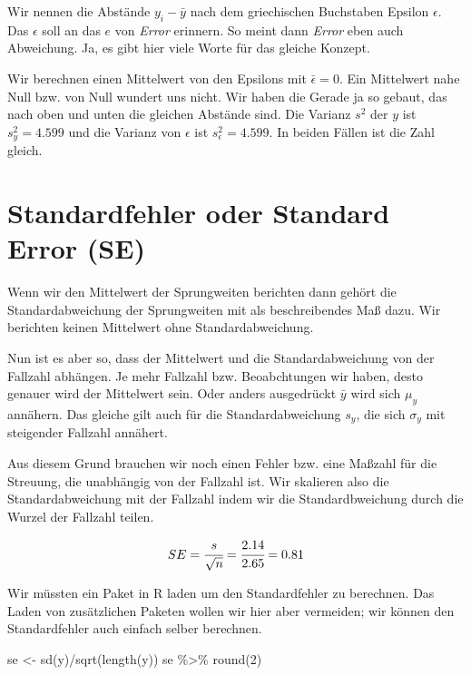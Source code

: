 \documentclass[
  letterpaper,
]{scrbook}
\newenvironment{Shaded}{\begin{snugshade}}{\end{snugshade}}
\newcommand{\DecValTok}[1]{\textcolor[rgb]{0.68,0.00,0.00}{#1}}
\newcommand{\FunctionTok}[1]{\textcolor[rgb]{0.28,0.35,0.67}{#1}}
\newcommand{\NormalTok}[1]{\textcolor[rgb]{0.00,0.23,0.31}{#1}}
\newcommand{\OtherTok}[1]{\textcolor[rgb]{0.00,0.23,0.31}{#1}}
\newcommand{\SpecialCharTok}[1]{\textcolor[rgb]{0.37,0.37,0.37}{#1}}
\begin{document}
Wir nennen die Abstände \(y_i - \bar{y}\) nach dem griechischen
Buchstaben Epsilon \(\epsilon\). Das \(\epsilon\) soll an das \(e\) von
\emph{Error} erinnern. So meint dann \emph{Error} eben auch Abweichung.
Ja, es gibt hier viele Worte für das gleiche Konzept.

Wir berechnen einen Mittelwert von den Epsilons mit
\(\bar{\epsilon} = 0\). Ein Mittelwert nahe Null bzw. von Null wundert
uns nicht. Wir haben die Gerade ja so gebaut, das nach oben und unten
die gleichen Abstände sind. Die Varianz \(s^2\) der \(y\) ist
\(s_y^2 = 4.599\) und die Varianz von \(\epsilon\) ist
\(s_{\epsilon}^2 = 4.599\). In beiden Fällen ist die Zahl gleich.

\hypertarget{standardfehler-oder-standard-error-se}{%
\section{Standardfehler oder Standard Error
(SE)}\label{standardfehler-oder-standard-error-se}}

Wenn wir den Mittelwert der Sprungweiten berichten dann gehört die
Standardabweichung der Sprungweiten mit als beschreibendes Maß dazu. Wir
berichten keinen Mittelwert ohne Standardabweichung.

Nun ist es aber so, dass der Mittelwert und die Standardabweichung von
der Fallzahl abhängen. Je mehr Fallzahl bzw. Beoabchtungen wir haben,
desto genauer wird der Mittelwert sein. Oder anders ausgedrückt
\(\bar{y}\) wird sich \(\mu_y\) annähern. Das gleiche gilt auch für die
Standardabweichung \(s_y\), die sich \(\sigma_y\) mit steigender
Fallzahl annähert.

Aus diesem Grund brauchen wir noch einen Fehler bzw. eine Maßzahl für
die Streuung, die unabhängig von der Fallzahl ist. Wir skalieren also
die Standardabweichung mit der Fallzahl indem wir die Standardbweichung
durch die Wurzel der Fallzahl teilen.

\[
SE = \cfrac{s}{\sqrt{n}} = \cfrac{2.14}{2.65} = 0.81
\]

Wir müssten ein Paket in R laden um den Standardfehler zu berechnen. Das
Laden von zusätzlichen Paketen wollen wir hier aber vermeiden; wir
können den Standardfehler auch einfach selber berechnen.

\begin{Shaded}
\begin{Highlighting}[]
\NormalTok{se }\OtherTok{\textless{}{-}} \FunctionTok{sd}\NormalTok{(y)}\SpecialCharTok{/}\FunctionTok{sqrt}\NormalTok{(}\FunctionTok{length}\NormalTok{(y))}
\NormalTok{se }\SpecialCharTok{\%\textgreater{}\%} \FunctionTok{round}\NormalTok{(}\DecValTok{2}\NormalTok{)}
\end{Highlighting}
\end{Shaded}
\end{document}
